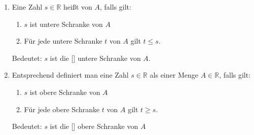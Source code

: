 \begin{enumerate}[label=\alph*)]
    \item Eine Zahl $s \in \mathbb{R}$ heißt  von $A$, falls gilt:
        \begin{enumerate}[label=\arabic*.]
            \item $s$ ist untere Schranke von $A$
            \item Für jede untere Schranke $t$ von $A$ gilt $t \leq s$.
        \end{enumerate}
        Bedeutet: $s$ ist die [] untere Schranke von $A$.
    \item Entsprechend definiert man eine Zahl $s \in \mathbb{R}$ als  einer Menge $A \in \mathbb{R}$, falls gilt:
        \begin{enumerate}[label=\arabic*.]
            \item $s$ ist obere Schranke von $A$
            \item Für jede obere Schranke $t$ von $A$ gilt $t \geq s$.
        \end{enumerate}
        Bedeutet: $s$ ist die [] obere Schranke von $A$
\end{enumerate}